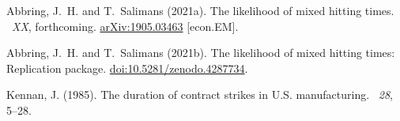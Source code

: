\documentclass[fleqn,12pt]{article}
\begin{document}
\begin{thebibliography}{}
Abbring, J.~H. and T.~Salimans (2021a).
\newblock The likelihood of mixed hitting times.
~{\em XX\/}, forthcoming.
\newblock \href{https://arxiv.org/abs/1905.03463}{arXiv:1905.03463} [econ.EM].

Abbring, J.~H. and T.~Salimans (2021b).
\newblock The likelihood of mixed hitting times: Replication package.
\newblock \href{https://doi.org/10.5281/zenodo.4287734}{doi:10.5281/zenodo.4287734}.

Kennan, J. (1985).
\newblock The duration of contract strikes in {U.S.} manufacturing.
~{\em 28}, 5--28.

\end{thebibliography}
\end{document}
